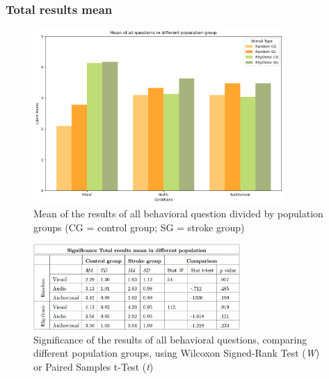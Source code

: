 \subsubsection*{Total results mean}
\begin{figure}[H]
    \centering
    \includegraphics[width=0.85\textwidth]{bar_plots/mean stroke and control.png}
    \caption{Mean of the results of all behavioral question divided by population groups (CG = control group; SG = stroke group)}
    \label{fig: mean_population_condition} 
\end{figure} 
\begin{figure}[H]
    \centering
    \includegraphics[width=0.70\textwidth]{significance_tables/tot_mean_pop.png}
    \caption{Significance of the results of all behavioral questions, comparing different population groups, using Wilcoxon Signed-Rank Test (\textit{W}) or Paired Samples t-Test (\textit{t})}
    \label{fig: significance_total_mean_pop} 
\end{figure} 

